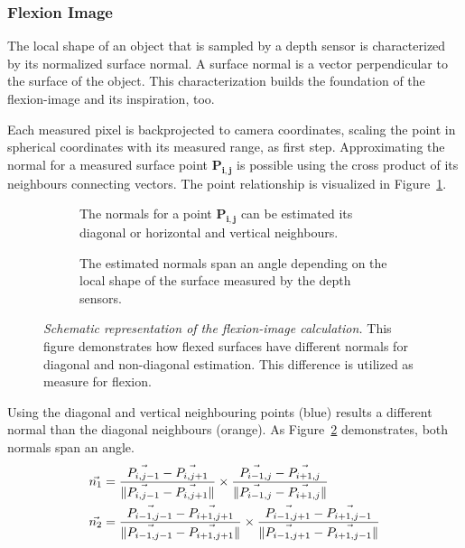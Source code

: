 \subsubsection{Flexion Image}\label{flexion-image-section}

The local shape of an object that is sampled by a depth sensor is characterized by its normalized surface normal.
A surface normal is a vector perpendicular to the surface of the object.
This characterization builds the foundation of the \Gls{flexion-image} and its inspiration, too.

Each measured pixel is backprojected to camera coordinates, scaling the point in spherical coordinates with its measured range, as first step.
Approximating the normal for a measured surface point $\mathbf{P_{i,j}}$ is possible using the cross product of its neighbours connecting vectors.
The point relationship is visualized in Figure~\ref{fig:flexion_normals_plane}.
\begin{figure}[H]
    \begin{subfigure}[t]{0.49\linewidth}
        \centering
        \scalebox{1.0}{%
        
        }
        \caption{The normals for a point $\mathbf{P_{i,j}}$ can be estimated its diagonal or horizontal and vertical neighbours.}\label{fig:flexion_normals_plane}
    \end{subfigure}
    \begin{subfigure}[t]{0.49\linewidth}
        \centering
        \scalebox{1.0}{%
        
        }
        \caption{The estimated normals span an angle depending on the local shape of the surface measured by the depth sensors.}\label{fig:flexion_space}
    \end{subfigure}
    \caption[Schematic representation of the \gls{flexion-image} calculation]{\emph{Schematic representation of the \gls{flexion-image} calculation.} This figure demonstrates how flexed surfaces have different normals for diagonal and non-diagonal estimation. This difference is utilized as measure for flexion.}%
    \label{fig:flexion-image-scetched}
\end{figure}
Using the diagonal and vertical neighbouring points (blue) results a different normal than the diagonal neighbours (orange).
As Figure~\ref{fig:flexion_space} demonstrates, both normals span an angle.
\begin{equation}
\begin{aligned}
    \vec{n_1} &= \frac{\vec{P_{i,j-1}} - \vec{P_{i,j+1}}}{\lVert\vec{P_{i,j-1}} - \vec{P_{i,j+1}}\rVert}
                \times \frac{\vec{P_{i-1,j}} - \vec{P_{i+1,j}}}{\lVert\vec{P_{i-1,j}} - \vec{P_{i+1,j}}\rVert} \\
    \vec{n_2} &= \frac{\vec{P_{i-1,j-1}} - \vec{P_{i+1,j+1}}}{\lVert\vec{P_{i-1,j-1}} - \vec{P_{i+1,j+1}}\rVert}
                \times \frac{\vec{P_{i-1,j+1}} - \vec{P_{i+1,j-1}}}{\lVert\vec{P_{i-1,j+1}} - \vec{P_{i+1,j-1}}\rVert}
    \label{eq:flexion_normals}
\end{aligned}
\end{equation}
